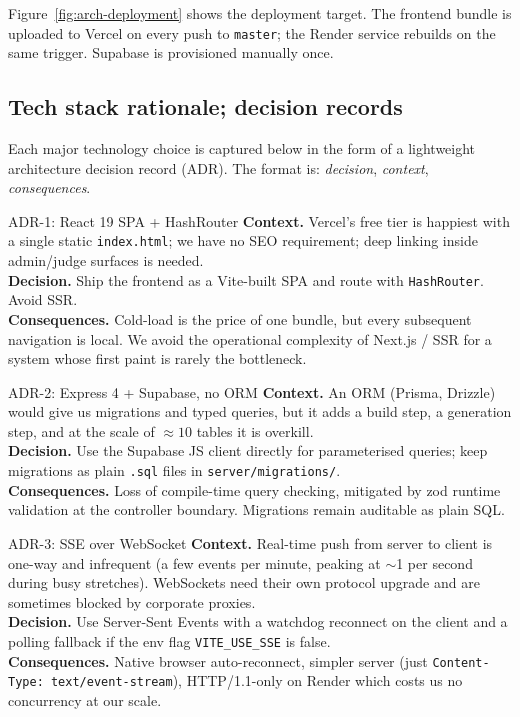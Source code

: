 Figure~\ref{fig:arch-deployment} shows the deployment target. The
frontend bundle is uploaded to Vercel on every push to \texttt{master}; the
Render service rebuilds on the same trigger. Supabase is provisioned
manually once.


\subsection{Tech stack rationale; decision records}

Each major technology choice is captured below in the form of a lightweight
architecture decision record (ADR). The format is: \emph{decision}, \emph{context},
\emph{consequences}.

\begin{ncbox}{ADR-1: React 19 SPA + HashRouter}
\textbf{Context.} Vercel's free tier is happiest with a single static
\texttt{index.html}; we have no SEO requirement; deep linking inside
admin/judge surfaces is needed.\\
\textbf{Decision.} Ship the frontend as a Vite-built SPA and route with
\texttt{HashRouter}. Avoid SSR.\\
\textbf{Consequences.} Cold-load is the price of one bundle, but every
subsequent navigation is local. We avoid the operational complexity of
Next.js / SSR for a system whose first paint is rarely the bottleneck.
\end{ncbox}

\begin{ncbox}{ADR-2: Express 4 + Supabase, no ORM}
\textbf{Context.} An ORM (Prisma, Drizzle) would give us migrations and
typed queries, but it adds a build step, a generation step, and at the
scale of $\approx10$ tables it is overkill.\\
\textbf{Decision.} Use the Supabase JS client directly for parameterised
queries; keep migrations as plain \texttt{.sql} files in
\texttt{server/migrations/}.\\
\textbf{Consequences.} Loss of compile-time query checking, mitigated by
zod runtime validation at the controller boundary. Migrations remain
auditable as plain SQL.
\end{ncbox}

\begin{ncbox}{ADR-3: SSE over WebSocket}
\textbf{Context.} Real-time push from server to client is one-way and
infrequent (a few events per minute, peaking at $\sim$1 per second during
busy stretches). WebSockets need their own protocol upgrade and are
sometimes blocked by corporate proxies.\\
\textbf{Decision.} Use Server-Sent Events with a watchdog reconnect on the
client and a polling fallback if the env flag \texttt{VITE\_USE\_SSE} is
false.\\
\textbf{Consequences.} Native browser auto-reconnect, simpler server (just
\texttt{Content-Type: text/event-stream}), HTTP/1.1-only on Render which
costs us no concurrency at our scale.
\end{ncbox}


